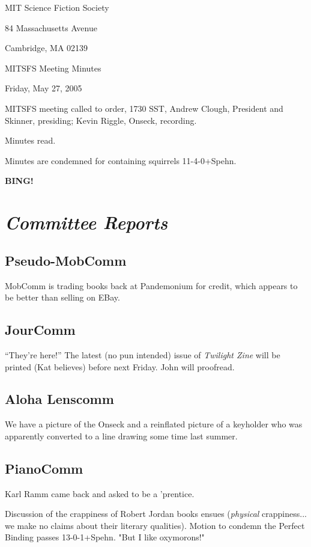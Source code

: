 \documentclass[10pt]{article}
\newcommand{\bing}{{\bf BING!} }
\newcommand{\goto}[1]{\bing \vskip 12pt \section*{{\em{#1}}}}
\begin{document}
\begin{center}

MIT Science Fiction Society

84 Massachusetts Avenue

Cambridge, MA 02139

\vspace{12pt}

MITSFS Meeting Minutes

Friday, May 27, 2005

\end{center}

\vspace{18pt}

\setlength{\parskip}{6pt}

\noindent
MITSFS meeting called to order, 1730 SST, Andrew Clough, President and
Skinner, presiding; Kevin Riggle,  Onseck, recording.

Minutes read.

Minutes are condemned for containing squirrels 11-4-0+Spehn.

\goto{Committee Reports}
\subsection*{Pseudo-MobComm}
MobComm is trading books back at Pandemonium for credit, which appears
to be better than selling on EBay.

\subsection*{JourComm}
``They're here!''  The latest (no pun intended) issue of {\em Twilight Zine}
 will be printed (Kat believes) before next Friday.  John will proofread.

\subsection*{Aloha Lenscomm}
We have a picture of the Onseck and a reinflated picture of a keyholder
who was apparently converted to a line drawing some time last summer.

\subsection*{PianoComm}
Karl Ramm came back and asked to be a 'prentice.

Discussion of the crappiness of Robert Jordan books ensues (\emph{physical}
crappiness...  we make no claims about their literary qualities).
Motion to condemn the Perfect Binding passes 13-0-1+Spehn.  "But I like
oxymorons!"
\end{document}
